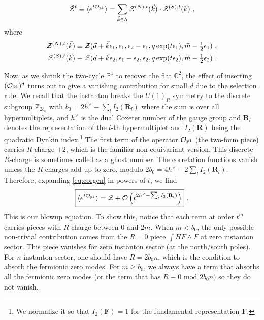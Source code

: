 \documentclass[letterpaper, 11pt]{article}
\def\IC{\mathbb{C}}
\def\IP{\mathbb{P}}
\def\IZ{\mathbb{Z}}
\def\CO{{\cal O}}
\def\CZ{{\cal Z}}
\def\e{\epsilon}
\begin{document}
\begin{align} \label{eq:corgen}
  \hat{\CZ}^{t} \equiv \langle e^{t  {\CO}_{\IP^1}}\rangle = \sum_{\vec{k} \in \Lambda}  \CZ^{(N),t}(\vec{k}) \cdot \CZ^{(S),t}(\vec{k})\ ,  
\end{align}
where
\begin{align}
  \label{eq:param-np-sp}
\begin{split}
  \CZ^{(N),t}(\vec{k}) &\equiv \CZ(\vec{a}+\vec{k} \e_1, \e_1, \e_2-\e_1, q \exp(t \e_1), \vec{m} -\tfrac{1}{2}\e_1) \ , \\
  \CZ^{(S),t}(\vec{k}) &\equiv \CZ(\vec{a}+\vec{k} \e_2, \e_1 - \e_2, \e_2, q \exp(t \e_2), \vec{m} -\tfrac{1}{2}\e_2)\ . \\
\end{split}
\end{align}

Now, as we shrink the two-cycle $\IP^1$ to recover the flat $\IC^2$, the effect of inserting $({\CO}_{\IP^1})^d$ turns out to give a vanishing contribution for small $d$ due to the selection rule. We recall that the instanton breaks the $U(1)_R$ symmetry to the discrete subgroup $\IZ_{2b_0}$ with $b_0 = 2h^\vee - \sum_l I_2(\mathbf{R}_l)$ where the sum is over all hypermultiplets, and $h^\vee$ is the dual Coxeter number of the gauge group and $\mathbf{R}_l$ denotes the representation of the $l$-th hypermultiplet and $I_2(\mathbf{R})$ being the quadratic Dynkin index.\footnote{We normalize it so that $I_2(\mathbf{F})= 1$ for the fundamental representation $\mathbf{F}$.} The first term of the operator ${\CO}_{\IP^1}$ (the two-form piece) carries $R$-charge $+2$, which is the familiar non-equivariant version. This discrete $R$-charge is sometimes called as a ghost number. The correlation functions vanish unless the $R$-charges add up to zero, modulo $2b_0 = 4h^\vee - 2\sum_l I_2(\mathbf{R}_l)$. 
Therefore, expanding \eqref{eq:corgen} in powers of $t$, we find
\begin{align}
  \label{eq:donaldson-4d}
  \boxed{  \langle e^{t {\CO}_{\IP^1}}\rangle = \CZ + \CO \left(t^{2h^\vee -  \sum_l I_2(\mathbf{R}_l)}\right) } \ . 
\end{align}
This is our blowup equation. 
To show this, notice that each term at order $t^m$ carries pieces with $R$-charge between $0$ and $2m$. When $m < b_0$, the only possible non-trivial contribution comes from the $R=0$ piece $ \int H F\wedge F$ at zero instanton sector.  This piece vanishes for zero instanton sector (at the north/south poles). For $n$-instanton sector, one should have $R=2b_0 n$, which is the condition to absorb the fermionic zero modes. For $m \ge b_0$, we always have a term that absorbs all the fermionic zero modes (or the term that has $R \equiv 0 \textrm{ mod } 2b_0 n)$ so they do not vanish. 
\end{document}
